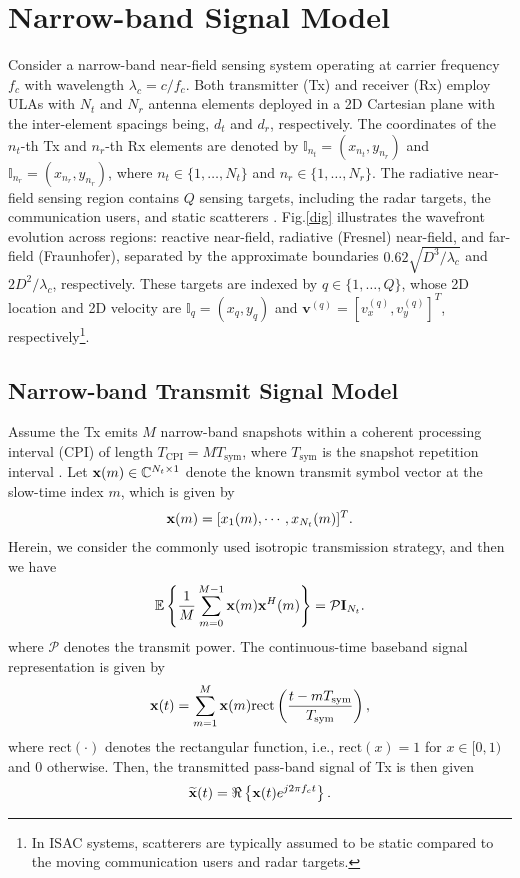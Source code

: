 \documentclass[9pt,final,journal,twocolumn]{IEEEtran}
\begin{document}
\section{Narrow-band Signal Model}
Consider a narrow-band near-field sensing system operating at carrier frequency $f_c$ with wavelength $\lambda_c=c/f_c$. Both transmitter (Tx) and  receiver (Rx) employ ULAs with $N_t$ and $N_r$ antenna elements deployed in a 2D Cartesian plane with the inter-element spacings being, $d_t$ and $d_r$, respectively. The coordinates of the $n_t$-th Tx and $n_r$-th Rx elements are denoted by ${\mathbb I}_{n_t}=(x_{n_t},y_{n_r})$ and ${\mathbb I}_{n_r}=(x_{n_r},y_{n_r})$, where $n_t\in\{1,\ldots,N_t\}$ and $n_r\in\{1,\ldots,N_r\}$. The radiative near-field sensing region contains $Q$ sensing targets, including the radar targets, the communication users, and static scatterers \cite{hu2024joint}. Fig.\ref{dig} illustrates the wavefront evolution across regions: reactive near-field, radiative (Fresnel) near-field, and far-field (Fraunhofer), separated by the approximate boundaries $0.62\sqrt{D^{3}/\lambda_c}$ and $2D^{2}/\lambda_c$, respectively.
These targets are indexed by $q\in\{1,\ldots,Q\}$, whose 2D location and 2D velocity are ${\mathbb I}_q=(x_q,y_q)$ and ${\bm v}^{(q)}=[v_x^{(q)},v_y^{(q)}]^T$, respectively\footnote{In ISAC systems, scatterers are typically assumed to be static compared to the moving communication users and radar targets\cite{mishra2024signal,mishra2019toward}.}.
%
\subsection{Narrow-band Transmit Signal Model}
Assume the Tx emits $M$ narrow-band snapshots within a coherent processing interval (CPI) of length $T_{\mathrm{CPI}}=MT_{\mathrm{sym}}$, where $T_{\mathrm{sym}}$ is the snapshot repetition interval \cite{xi2020gridless}. Let ${\bf x}(m)\in\mathbb{C}^{N_t\times 1}$ denote the known transmit symbol vector at the slow-time index $m$, which is given by
\begin{align}
{\bf x}(m)=[x_{1}(m),\cdots,x_{N_t}(m)]^T.
\end{align}
Herein, we consider the commonly used isotropic transmission strategy, %
and then we have 
\begin{equation}\label{iso_trans}
\mathbb{E}\left\{\frac{1}{M}\sum_{m=0}^{M-1}{\bf x}(m){\bf x}^H(m)\right\}=\mathcal{P}{\bf I}_{N_t}.
\end{equation}
where $\mathcal{P}$ denotes the transmit power. 
The continuous-time baseband signal representation is given by
\begin{align}\label{eq:NB_tx_bb}
{\bf x}(t)=\sum_{m=1}^{M}{\bf x}(m)\mathrm{rect}\left(\frac{t-mT_{\mathrm{sym}}}{T_{\mathrm{sym}}}\right),
\end{align}
where $\mathrm{rect}(\cdot)$ denotes the rectangular function, i.e., $\mathrm{rect}(x)=1$ for $x\in[0,1)$ and $0$ otherwise.
Then, the transmitted pass-band signal of Tx is then given
\begin{align}\label{eq:NB_tx_pb}
\widetilde{\bf x}(t)=\Re\left\{{\bf x}(t)e^{j2\pi f_ct}\right\}.
\end{align}
%
\end{document}
